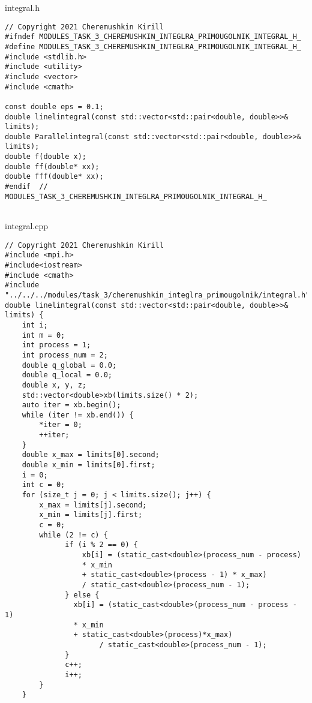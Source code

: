 \documentclass{report}
\begin{document}
integral.h
\begin{lstlisting}
// Copyright 2021 Cheremushkin Kirill
#ifndef MODULES_TASK_3_CHEREMUSHKIN_INTEGLRA_PRIMOUGOLNIK_INTEGRAL_H_
#define MODULES_TASK_3_CHEREMUSHKIN_INTEGLRA_PRIMOUGOLNIK_INTEGRAL_H_
#include <stdlib.h>
#include <utility>
#include <vector>
#include <cmath>

const double eps = 0.1;
double linelintegral(const std::vector<std::pair<double, double>>& limits);
double Parallelintegral(const std::vector<std::pair<double, double>>& limits);
double f(double x);
double ff(double* xx);
double fff(double* xx);
#endif  // MODULES_TASK_3_CHEREMUSHKIN_INTEGLRA_PRIMOUGOLNIK_INTEGRAL_H_


\end{lstlisting}
integral.cpp
\begin{lstlisting}
// Copyright 2021 Cheremushkin Kirill
#include <mpi.h>
#include<iostream>
#include <cmath>
#include "../../../modules/task_3/cheremushkin_integlra_primougolnik/integral.h"
double linelintegral(const std::vector<std::pair<double, double>>& limits) {
    int i;
    int m = 0;
    int process = 1;
    int process_num = 2;
    double q_global = 0.0;
    double q_local = 0.0;
    double x, y, z;
    std::vector<double>xb(limits.size() * 2);
    auto iter = xb.begin();
    while (iter != xb.end()) {
        *iter = 0;
        ++iter;
    }
    double x_max = limits[0].second;
    double x_min = limits[0].first;
    i = 0;
    int c = 0;
    for (size_t j = 0; j < limits.size(); j++) {
        x_max = limits[j].second;
        x_min = limits[j].first;
        c = 0;
        while (2 != c) {
              if (i % 2 == 0) {
                  xb[i] = (static_cast<double>(process_num - process)
                  * x_min
                  + static_cast<double>(process - 1) * x_max)
                  / static_cast<double>(process_num - 1);
              } else {
                xb[i] = (static_cast<double>(process_num - process - 1)
                * x_min
                + static_cast<double>(process)*x_max)
                      / static_cast<double>(process_num - 1);
              }
              c++;
              i++;
        }
    }


\end{lstlisting}
\end{document}
